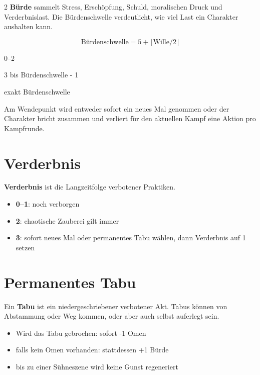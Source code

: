 \begin{multicols*}{2}
\textbf{Bürde} sammelt Stress, Erschöpfung, Schuld, moralischen Druck und Verderbnislast.
Die Bürdenschwelle verdeutlicht, wie viel Last ein Charakter aushalten kann.

\[
\text{Bürdenschwelle} = 5 + \lfloor \text{Wille} / 2 \rfloor
\]

\begin{description}[style=nextline,leftmargin=0pt]
\item[\textbf{Stabil}] 0--2
\item[\textbf{Belastet}] 3 bis Bürdenschwelle - 1
\item[\textbf{Wendepunkt}] exakt Bürdenschwelle
\end{description}

Am Wendepunkt wird entweder sofort ein neues Mal genommen oder der Charakter bricht zusammen und verliert für den aktuellen Kampf eine Aktion pro Kampfrunde.

\section{Verderbnis}\label{sec:verderbnis}

\textbf{Verderbnis} ist die Langzeitfolge verbotener Praktiken.

\begin{itemize}[leftmargin=*]
\item \textbf{0--1}: noch verborgen
\item \textbf{2}: chaotische Zauberei gilt immer
\item \textbf{3}: sofort neues Mal oder permanentes Tabu wählen, dann Verderbnis auf 1 setzen
\end{itemize}

\section{Permanentes Tabu}\label{sec:permanentes-tabu}

Ein \textbf{Tabu} ist ein niedergeschriebener verbotener Akt.
Tabus können von Abstammung oder Weg kommen, oder aber auch selbst auferlegt sein.

\begin{itemize}[leftmargin=*]
\item Wird das Tabu gebrochen: sofort -1 Omen
\item falls kein Omen vorhanden: stattdessen +1 Bürde
\item bis zu einer Sühneszene wird keine Gunst regeneriert
\end{itemize}


\end{multicols*}
